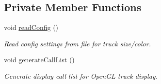 \subsection*{Private Member Functions}
\begin{DoxyCompactItemize}
\item 
void \hyperlink{class_g_c_s_display_a0609c23f5133b51b6459fa34c26776d1}{readConfig} ()
\begin{DoxyCompactList}\small\item\em Read config settings from file for truck size/color. \end{DoxyCompactList}\item 
void \hyperlink{class_g_c_s_display_a2b69f994d5c30e19d166fb9a717bfed5}{generateCallList} ()
\begin{DoxyCompactList}\small\item\em Generate display call list for OpenGL truck display. \end{DoxyCompactList}\end{DoxyCompactItemize}
